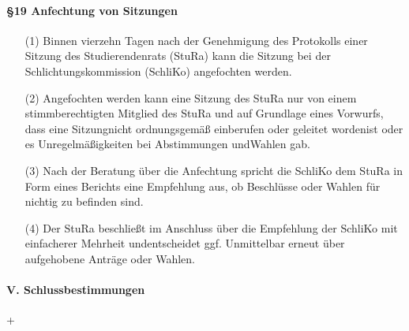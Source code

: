         \paragraph{§19 Anfechtung von Sitzungen}
            \begin{itemize}
                \item[(1)] Binnen vierzehn Tagen nach der Genehmigung des Protokolls einer Sitzung des Studierendenrats (StuRa) kann die Sitzung bei der Schlichtungskommission (SchliKo) angefochten werden.
                \item[(2)] Angefochten werden kann eine Sitzung des StuRa nur von einem stimmberechtigten Mitglied des StuRa und auf Grundlage eines Vorwurfs, dass eine Sitzungnicht ordnungsgemäß einberufen oder geleitet wordenist oder es Unregelmäßigkeiten bei Abstimmungen undWahlen gab.
                \item[(3)] Nach der Beratung über die Anfechtung spricht die SchliKo dem StuRa in Form eines Berichts eine Empfehlung aus, ob Beschlüsse oder Wahlen für nichtig zu befinden sind.
                \item[(4)] Der StuRa beschließt im Anschluss über die Empfehlung der SchliKo mit einfacherer Mehrheit undentscheidet ggf. Unmittelbar erneut über aufgehobene Anträge oder Wahlen. 
            \end{itemize}
    \paragraph{V. Schlussbestimmungen}+
